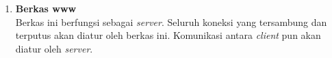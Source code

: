 \begin{enumerate}
\begin{enumerate}
\begin{itemize}
%				
%				
%				
			
		\end{itemize}
	
		\item \textbf{Berkas www} \\
		Berkas ini berfungsi sebagai \textit{server}. Seluruh koneksi yang tersambung dan terputus akan diatur oleh berkas ini. Komunikasi antara \textit{client} pun akan diatur oleh \textit{server}.
		

\end{enumerate}
\end{enumerate}
